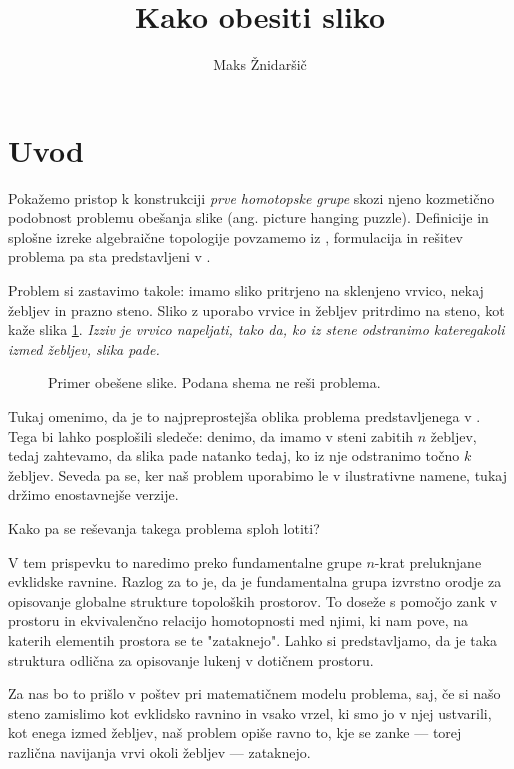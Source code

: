 \documentclass[11pt, a4paper]{article}
\title{Kako obesiti sliko}
\author{Maks Žnidaršič}
\date{}
\begin{document}
\maketitle


\section{Uvod}


Pokažemo pristop k konstrukciji \textit{prve homotopske grupe} skozi njeno kozmetično podobnost problemu obešanja slike (ang. picture hanging puzzle). Definicije in splošne izreke algebraične topologije povzamemo iz \cite{topologie-algebrique}, formulacija in rešitev problema pa sta predstavljeni v \cite{picture-hanging-puzzles}.

Problem si zastavimo takole: imamo sliko pritrjeno na sklenjeno vrvico, nekaj žebljev in prazno steno. Sliko z uporabo vrvice in žebljev pritrdimo na steno, kot kaže slika \ref{mucka}. \textit{Izziv je vrvico napeljati, tako da, ko iz stene odstranimo kateregakoli izmed žebljev, slika pade.}

\begin{figure}[H]
    \centering
    
    \caption{Primer obešene slike. Podana shema ne reši problema.}
    \label{mucka}
\end{figure}

Tukaj omenimo, da je to najpreprostejša oblika problema predstavljenega v \cite{picture-hanging-puzzles}. Tega bi lahko posplošili sledeče: denimo, da imamo v steni zabitih $n$ žebljev, tedaj zahtevamo, da slika pade natanko tedaj, ko iz nje odstranimo točno $k$ žebljev. Seveda pa se, ker naš problem uporabimo le v ilustrativne namene, tukaj držimo enostavnejše verzije.

Kako pa se reševanja takega problema sploh lotiti?

V tem prispevku to naredimo preko fundamentalne grupe $n$-krat preluknjane evklidske ravnine. Razlog za to je, da je fundamentalna grupa izvrstno orodje za opisovanje globalne strukture topoloških prostorov. To doseže s pomočjo zank v prostoru in ekvivalenčno relacijo homotopnosti med njimi, ki nam pove, na katerih elementih prostora se te "{}zataknejo". Lahko si predstavljamo, da je taka struktura odlična za opisovanje lukenj v dotičnem prostoru.

Za nas bo to prišlo v poštev pri matematičnem modelu problema, saj, če si našo steno zamislimo kot evklidsko ravnino in vsako vrzel, ki smo jo v njej ustvarili, kot enega izmed žebljev, naš problem opiše ravno to, kje se zanke — torej različna navijanja vrvi okoli žebljev — zataknejo.
\end{document}
